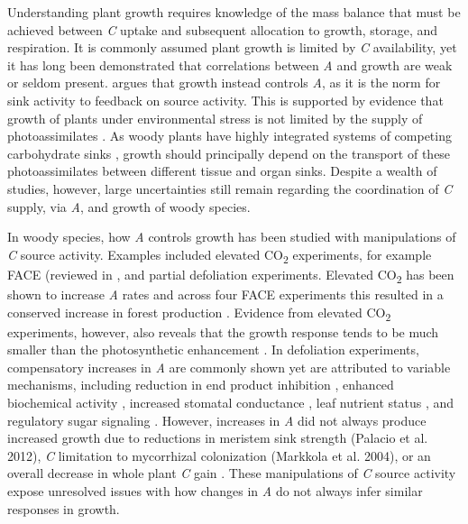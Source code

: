 \documentclass[a4paper]{article}\usepackage[]{graphicx}\usepackage[]{color}
\begin{document}
Understanding plant growth requires knowledge of the mass balance that must be achieved between \textit{C} uptake and subsequent allocation to growth, storage, and respiration. It is commonly assumed plant growth is limited by \textit{C} availability, yet it has long been demonstrated that correlations between \textit{A} and growth are weak or seldom present. \citet{korner2013growth} argues that growth instead controls \textit{A}, as it is the norm for sink activity to feedback on source activity. This is supported by evidence that growth of plants under environmental stress is not limited by the supply of photoassimilates \citep{palacio2014does}. As woody plants have highly integrated systems of competing carbohydrate sinks \citep{kozlowski1992carbohydrate}, growth should principally depend on the transport of these photoassimilates between different tissue and organ sinks. Despite a wealth of studies, however, large uncertainties still remain regarding the coordination of \textit{C} supply, via \textit{A}, and growth of woody species.

In woody species, how \textit{A} controls growth has been studied with manipulations of \textit{C} source activity. Examples included elevated CO\textsubscript{2} experiments, for example FACE (reviewed in  \citet{ainsworth2005have}, and partial defoliation experiments. Elevated CO\textsubscript{2} has been shown to increase \textit{A} rates \citep{drake1997more,ainsworth2007response} and across four FACE experiments this resulted in a conserved increase in forest production \citep{norby2005forest}. Evidence from elevated CO\textsubscript{2} experiments, however, also reveals that the growth response tends to be much smaller than the photosynthetic enhancement \citep{kirschbaum2011does}. In defoliation experiments, compensatory increases in \textit{A} are commonly shown yet are attributed to variable mechanisms, including reduction in end product inhibition \citep{iglesias2002regulation,zhou2003changes,handa2005test}, enhanced biochemical activity \citep{ovaska1993b,layne1995end}, increased stomatal conductance \citep{layne1995end}, leaf nutrient status \citep{turnbull2007increased}, and regulatory sugar signaling \citep{eyles2013whole}. However, increases in \textit{A} did not always produce increased growth due to reductions in meristem sink strength (Palacio et al. 2012), \textit{C} limitation to mycorrhizal colonization (Markkola et al. 2004), or an overall decrease in whole plant \textit{C} gain \citep{ovaska1993a}. These manipulations of \textit{C} source activity expose unresolved issues with how changes in \textit{A} do not always infer similar responses in growth.
\end{document}
